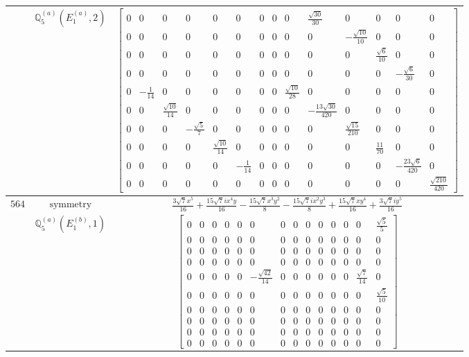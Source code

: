 \documentclass[fleqn,8pt,landscape]{jsarticle}
\begin{document}
\begin{longtable}{ccc}
$  $ & $ \mathbb{Q}_{5}^{(a)}(E_{1}^{(a)},2) $ & $ \begin{bmatrix} 0 & 0 & 0 & 0 & 0 & 0 & 0 & 0 & 0 & \frac{\sqrt{30}}{30} & 0 & 0 & 0 & 0 \\ 0 & 0 & 0 & 0 & 0 & 0 & 0 & 0 & 0 & 0 & - \frac{\sqrt{10}}{10} & 0 & 0 & 0 \\ 0 & 0 & 0 & 0 & 0 & 0 & 0 & 0 & 0 & 0 & 0 & \frac{\sqrt{6}}{10} & 0 & 0 \\ 0 & 0 & 0 & 0 & 0 & 0 & 0 & 0 & 0 & 0 & 0 & 0 & - \frac{\sqrt{6}}{30} & 0 \\ 0 & - \frac{1}{14} & 0 & 0 & 0 & 0 & 0 & 0 & \frac{\sqrt{10}}{28} & 0 & 0 & 0 & 0 & 0 \\ 0 & 0 & \frac{\sqrt{10}}{14} & 0 & 0 & 0 & 0 & 0 & 0 & - \frac{13 \sqrt{30}}{420} & 0 & 0 & 0 & 0 \\ 0 & 0 & 0 & - \frac{\sqrt{5}}{7} & 0 & 0 & 0 & 0 & 0 & 0 & \frac{\sqrt{15}}{210} & 0 & 0 & 0 \\ 0 & 0 & 0 & 0 & \frac{\sqrt{10}}{14} & 0 & 0 & 0 & 0 & 0 & 0 & \frac{11}{70} & 0 & 0 \\ 0 & 0 & 0 & 0 & 0 & - \frac{1}{14} & 0 & 0 & 0 & 0 & 0 & 0 & - \frac{23 \sqrt{6}}{420} & 0 \\ 0 & 0 & 0 & 0 & 0 & 0 & 0 & 0 & 0 & 0 & 0 & 0 & 0 & \frac{\sqrt{210}}{420} \end{bmatrix} $ \\ \hline
$ 564 $ & $ \text{symmetry} $ & $ \frac{3 \sqrt{7} x^{5}}{16} + \frac{15 \sqrt{7} i x^{4} y}{16} - \frac{15 \sqrt{7} x^{3} y^{2}}{8} - \frac{15 \sqrt{7} i x^{2} y^{3}}{8} + \frac{15 \sqrt{7} x y^{4}}{16} + \frac{3 \sqrt{7} i y^{5}}{16} $ \\
$  $ & $ \mathbb{Q}_{5}^{(a)}(E_{1}^{(b)},1) $ & $ \begin{bmatrix} 0 & 0 & 0 & 0 & 0 & 0 & 0 & 0 & 0 & 0 & 0 & 0 & 0 & \frac{\sqrt{5}}{5} \\ 0 & 0 & 0 & 0 & 0 & 0 & 0 & 0 & 0 & 0 & 0 & 0 & 0 & 0 \\ 0 & 0 & 0 & 0 & 0 & 0 & 0 & 0 & 0 & 0 & 0 & 0 & 0 & 0 \\ 0 & 0 & 0 & 0 & 0 & 0 & 0 & 0 & 0 & 0 & 0 & 0 & 0 & 0 \\ 0 & 0 & 0 & 0 & 0 & - \frac{\sqrt{42}}{14} & 0 & 0 & 0 & 0 & 0 & 0 & \frac{\sqrt{7}}{14} & 0 \\ 0 & 0 & 0 & 0 & 0 & 0 & 0 & 0 & 0 & 0 & 0 & 0 & 0 & \frac{\sqrt{5}}{10} \\ 0 & 0 & 0 & 0 & 0 & 0 & 0 & 0 & 0 & 0 & 0 & 0 & 0 & 0 \\ 0 & 0 & 0 & 0 & 0 & 0 & 0 & 0 & 0 & 0 & 0 & 0 & 0 & 0 \\ 0 & 0 & 0 & 0 & 0 & 0 & 0 & 0 & 0 & 0 & 0 & 0 & 0 & 0 \\ 0 & 0 & 0 & 0 & 0 & 0 & 0 & 0 & 0 & 0 & 0 & 0 & 0 & 0 \end{bmatrix} $ \\ \hline

\end{longtable}
\end{document}
